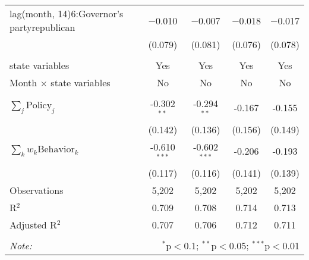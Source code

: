 \begin{tabular}{@{\extracolsep{1pt}}lcccc}
  lag(month, 14)6:Governor's partyrepublican & $-$0.010 & $-$0.007 & $-$0.018 & $-$0.017 \\ 
  & (0.079) & (0.081) & (0.076) & (0.078) \\ 
 \hline \\[-1.8ex] 
state variables & Yes & Yes & Yes & Yes \\ 
Month $\times$ state variables & No & No & No & No \\ 
\hline \\[-1.8ex] 
$\sum_j \mathrm{Policy}_j$ & -0.302$^{**}$ & -0.294$^{**}$ & -0.167 & -0.155 \\ 
 & (0.142) & (0.136) & (0.156) & (0.149) \\ 
$\sum_k w_k \mathrm{Behavior}_k$ & -0.610$^{***}$ & -0.602$^{***}$ & -0.206 & -0.193 \\ 
 & (0.117) & (0.116) & (0.141) & (0.139) \\ 
Observations & 5,202 & 5,202 & 5,202 & 5,202 \\ 
R$^{2}$ & 0.709 & 0.708 & 0.714 & 0.713 \\ 
Adjusted R$^{2}$ & 0.707 & 0.706 & 0.712 & 0.711 \\ 
\hline 
\hline \\[-1.8ex] 
\textit{Note:}  & \multicolumn{4}{r}{$^{*}$p$<$0.1; $^{**}$p$<$0.05; $^{***}$p$<$0.01} \\ 
\end{tabular} 